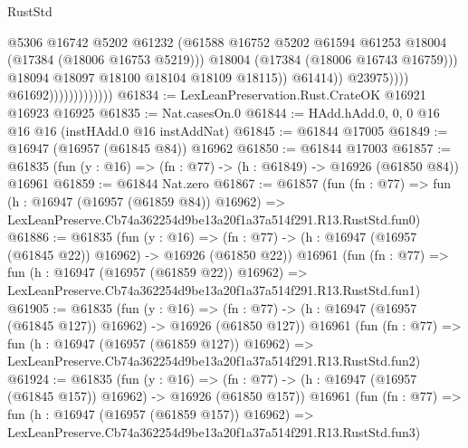 \begin{lexlean}{RustStd}
\begin{coremodule}
                                                @5306
                                                @16742
                                                @5202
                                                @61232
                                                (@61588
                                                  @16752
                                                  @5202
                                                  @61594
                                                  @61253
                                                  @18004
                                                  (@17384 (@18006 @16753 @5219)))
                                                @18004
                                                (@17384 (@18006 @16743 @16759)))
                                              @18094
                                              @18097
                                              @18100
                                              @18104
                                              @18109
                                              @18115))
                                          @61414))
                                      @23975))))
                              @61692)))))))))))))
@61834 := LexLeanPreservation.Rust.CrateOK @16921 @16923 @16925
@61835 := Nat.casesOn.{0}
@61844 := HAdd.hAdd.{0, 0, 0} @16 @16 @16 (instHAdd.{0} @16 instAddNat)
@61845 := @61844 @17005
@61849 := @16947 (@16957 (@61845 @84)) @16962
@61850 := @61844 @17003
@61857 := @61835 (fun (y : @16) => (fn : @77) -> (h : @61849) -> @16926 (@61850 @84)) @16961
@61859 := @61844 Nat.zero
@61867 := @61857
    (fun (fn : @77) =>
    fun (h : @16947 (@16957 (@61859 @84)) @16962) =>
    LexLeanPreserve.Cb74a362254d9be13a20f1a37a514f291.R13.RustStd.fun0)
@61886 := @61835
    (fun (y : @16) =>
    (fn : @77) -> (h : @16947 (@16957 (@61845 @22)) @16962) -> @16926 (@61850 @22))
    @16961
    (fun (fn : @77) =>
    fun (h : @16947 (@16957 (@61859 @22)) @16962) =>
    LexLeanPreserve.Cb74a362254d9be13a20f1a37a514f291.R13.RustStd.fun1)
@61905 := @61835
    (fun (y : @16) =>
    (fn : @77) -> (h : @16947 (@16957 (@61845 @127)) @16962) -> @16926 (@61850 @127))
    @16961
    (fun (fn : @77) =>
    fun (h : @16947 (@16957 (@61859 @127)) @16962) =>
    LexLeanPreserve.Cb74a362254d9be13a20f1a37a514f291.R13.RustStd.fun2)
@61924 := @61835
    (fun (y : @16) =>
    (fn : @77) -> (h : @16947 (@16957 (@61845 @157)) @16962) -> @16926 (@61850 @157))
    @16961
    (fun (fn : @77) =>
    fun (h : @16947 (@16957 (@61859 @157)) @16962) =>
    LexLeanPreserve.Cb74a362254d9be13a20f1a37a514f291.R13.RustStd.fun3)

\end{coremodule}
\end{lexlean}
